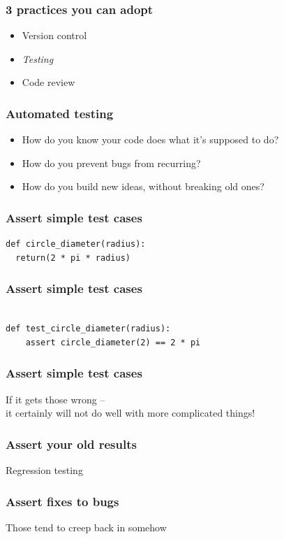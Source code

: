 \documentclass{beamer}
\begin{document}
\begin{frame}
\frametitle{3 practices you can adopt}
\begin{itemize}
\item
Version control
\item
\emph{Testing}
\item
Code review 
\end{itemize}
\end{frame}


\begin{frame}
\frametitle{Automated testing}
\begin{itemize}
\pause
\item
How do you know your code does what it's supposed to do?
\pause
\item
How do you prevent bugs from recurring?
\item
\pause 
How do you build new ideas, without breaking old ones?
\end{itemize}
\end{frame}

\begin{frame}[fragile]
\frametitle{Assert simple test cases}
\begin{lstlisting}
def circle_diameter(radius):
  return(2 * pi * radius)
\end{lstlisting}
\end{frame}

\begin{frame}[fragile]
\frametitle{Assert simple test cases}
\begin{lstlisting}

def test_circle_diameter(radius):
    assert circle_diameter(2) == 2 * pi

\end{lstlisting}
\end{frame}

\begin{frame}[fragile]
\frametitle{Assert simple test cases}
If it gets those wrong -- 
\\ 
it certainly will not do well with more complicated things!
\end{frame}


\begin{frame}[fragile]
\frametitle{Assert your old results}

Regression testing

\end{frame}


\begin{frame}[fragile]
\frametitle{Assert fixes to bugs}

Those tend to creep back in somehow 

\end{frame}
\end{document}

